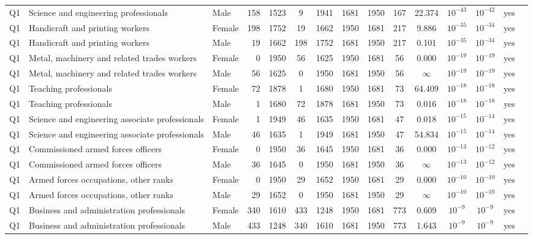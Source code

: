 \begin{longtable}{lllrcccccccccll}
Q1 & Science and engineering professionals & Male & 158 & 1523 & 9 & 1941 & 1681 & 1950 & 167 & 22.374 & $10^{-43}$ & $10^{-42}$ & yes \\
Q1 & Handicraft and printing workers & Female & 198 & 1752 & 19 & 1662 & 1950 & 1681 & 217 & 9.886 & $10^{-35}$ & $10^{-34}$ & yes \\
Q1 & Handicraft and printing workers & Male & 19 & 1662 & 198 & 1752 & 1681 & 1950 & 217 & 0.101 & $10^{-35}$ & $10^{-34}$ & yes \\
Q1 & Metal, machinery and related trades workers & Female & 0 & 1950 & 56 & 1625 & 1950 & 1681 & 56 & 0.000 & $10^{-19}$ & $10^{-19}$ & yes \\
Q1 & Metal, machinery and related trades workers & Male & 56 & 1625 & 0 & 1950 & 1681 & 1950 & 56 & $\infty$ & $10^{-19}$ & $10^{-19}$ & yes \\
Q1 & Teaching professionals & Female & 72 & 1878 & 1 & 1680 & 1950 & 1681 & 73 & 64.409 & $10^{-18}$ & $10^{-18}$ & yes \\
Q1 & Teaching professionals & Male & 1 & 1680 & 72 & 1878 & 1681 & 1950 & 73 & 0.016 & $10^{-18}$ & $10^{-18}$ & yes \\
Q1 & Science and engineering associate professionals & Female & 1 & 1949 & 46 & 1635 & 1950 & 1681 & 47 & 0.018 & $10^{-15}$ & $10^{-14}$ & yes \\
Q1 & Science and engineering associate professionals & Male & 46 & 1635 & 1 & 1949 & 1681 & 1950 & 47 & 54.834 & $10^{-15}$ & $10^{-14}$ & yes \\
Q1 & Commissioned armed forces officers & Female & 0 & 1950 & 36 & 1645 & 1950 & 1681 & 36 & 0.000 & $10^{-13}$ & $10^{-12}$ & yes \\
Q1 & Commissioned armed forces officers & Male & 36 & 1645 & 0 & 1950 & 1681 & 1950 & 36 & $\infty$ & $10^{-13}$ & $10^{-12}$ & yes \\
Q1 & Armed forces occupations, other ranks & Female & 0 & 1950 & 29 & 1652 & 1950 & 1681 & 29 & 0.000 & $10^{-10}$ & $10^{-10}$ & yes \\
Q1 & Armed forces occupations, other ranks & Male & 29 & 1652 & 0 & 1950 & 1681 & 1950 & 29 & $\infty$ & $10^{-10}$ & $10^{-10}$ & yes \\
Q1 & Business and administration professionals & Female & 340 & 1610 & 433 & 1248 & 1950 & 1681 & 773 & 0.609 & $10^{-9}$ & $10^{-9}$ & yes \\
Q1 & Business and administration professionals & Male & 433 & 1248 & 340 & 1610 & 1681 & 1950 & 773 & 1.643 & $10^{-9}$ & $10^{-9}$ & yes \\

\end{longtable}
